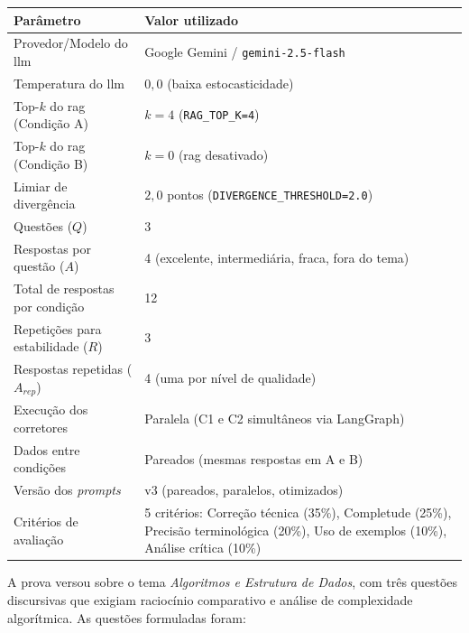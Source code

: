 \begin{quadro}[H]
    \centering
    \caption{Parâmetros efetivos do experimento}
    \label{qua:config-experimento}
    {\small
    \begin{tabularx}{\textwidth}{|p{}|X|}
        \hline
        \textbf{Parâmetro} & \textbf{Valor utilizado} \\
        \hline
        Provedor/Modelo do \gls{llm} & Google Gemini / \texttt{gemini-2.5-flash} \\
        \hline
        Temperatura do \gls{llm} & $0{,}0$ (baixa estocasticidade) \\
        \hline
        Top-$k$ do \gls{rag} (Condição A) & $k=4$ (\texttt{RAG\_TOP\_K=4}) \\
        \hline
        Top-$k$ do \gls{rag} (Condição B) & $k=0$ (\gls{rag} desativado) \\
        \hline
        Limiar de divergência & $2{,}0$ pontos (\texttt{DIVERGENCE\_THRESHOLD=2.0}) \\
        \hline
        Questões ($Q$) & 3 \\
        \hline
        Respostas por questão ($A$) & 4 (excelente, intermediária, fraca, fora do tema) \\
        \hline
        Total de respostas por condição & 12 \\
        \hline
        Repetições para estabilidade ($R$) & 3 \\
        \hline
        Respostas repetidas ($A_{rep}$) & 4 (uma por nível de qualidade) \\
        \hline
        Execução dos corretores & Paralela (C1 e C2 simultâneos via LangGraph) \\
        \hline
        Dados entre condições & Pareados (mesmas respostas em A e B) \\
        \hline
        Versão dos \textit{prompts} & v3 (pareados, paralelos, otimizados) \\
        \hline
        Critérios de avaliação & 5 critérios: Correção técnica (35\%), Completude (25\%), Precisão terminológica (20\%), Uso de exemplos (10\%), Análise crítica (10\%) \\
        \hline
    \end{tabularx}
    }
\end{quadro}

A prova versou sobre o tema \textit{Algoritmos e Estrutura de Dados}, com três questões discursivas que exigiam raciocínio comparativo e análise de complexidade algorítmica. As questões formuladas foram:

